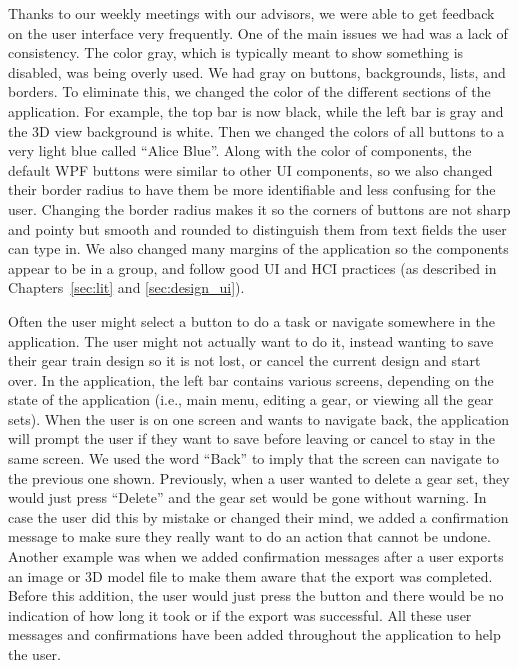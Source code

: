 \begin{doublespace}
Thanks to our weekly meetings with our advisors, we were able to get feedback on the user interface very frequently. One of the main issues we had was a lack of consistency. The color gray, which is typically meant to show something is disabled, was being overly used. We had gray on buttons, backgrounds, lists, and borders. To eliminate this, we changed the color of the different sections of the application. For example, the top bar is now black, while the left bar is gray and the 3D view background is white. Then we changed the colors of all buttons to a very light blue called ``Alice Blue''. Along with the color of components, the default WPF buttons were similar to other UI components, so we also changed their border radius to have them be more identifiable and less confusing for the user. Changing the border radius makes it so the corners of buttons are not sharp and pointy but smooth and rounded to distinguish them from text fields the user can type in. We also changed many margins of the application so the components appear to be in a group, and follow good UI and HCI practices (as described in Chapters~\ref{sec:lit} and \ref{sec:design_ui}).

Often the user might select a button to do a task or navigate somewhere in the application. The user might not actually want to do it, instead wanting to save their gear train design so it is not lost, or cancel the current design and start over. In the application, the left bar contains various screens, depending on the state of the application (i.e., main menu, editing a gear, or viewing all the gear sets). When the user is on one screen and wants to navigate back, the application will prompt the user if they want to save before leaving or cancel to stay in the same screen. We used the word ``Back'' to imply that the screen can navigate to the previous one shown. Previously, when a user wanted to delete a gear set, they would just press ``Delete'' and the gear set would be gone without warning. In case the user did this by mistake or changed their mind, we added a confirmation message to make sure they really want to do an action that cannot be undone. Another example was when we added confirmation messages after a user exports an image or 3D model file to make them aware that the export was completed. Before this addition, the user would just press the button and there would be no indication of how long it took or if the export was successful. All these user messages and confirmations have been added throughout the application to help the user.



\end{doublespace}
